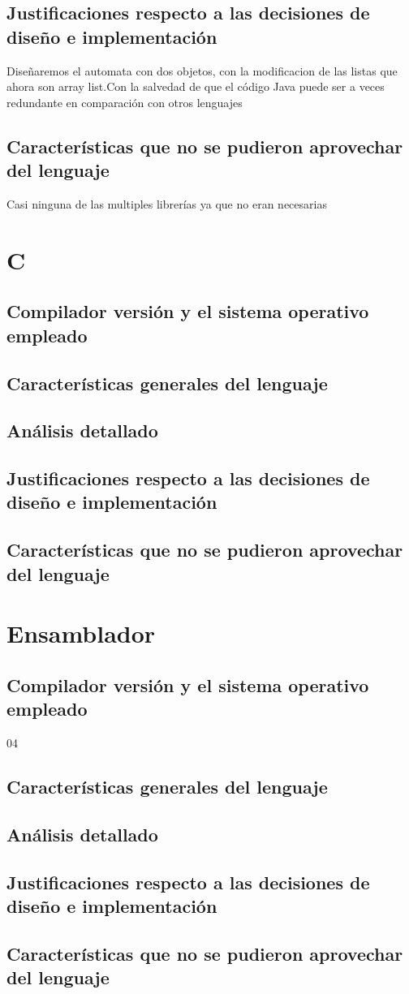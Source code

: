 \documentclass[12pt,a4paper]{article}
\begin{document}
    \subsection{Justificaciones respecto a las decisiones de diseño e implementación}
    Diseñaremos el automata con dos objetos, con la modificacion de las listas que ahora son array list.Con la salvedad de que el código Java puede ser a veces redundante en comparación con otros lenguajes
    \subsection{Características que no se pudieron aprovechar del lenguaje}
    Casi ninguna de las multiples librerías ya que no eran necesarias
      \section{C}
       \subsection{Compilador versión y el sistema operativo empleado}
        \subsection{Características generales del lenguaje}
        \subsection{Análisis detallado}
        \subsection{Justificaciones respecto a las decisiones de diseño e implementación}
        \subsection{Características que no se pudieron aprovechar del lenguaje}
          \section{Ensamblador}
           \subsection{Compilador versión y el sistema operativo empleado}04
            \subsection{Características generales del lenguaje}
            \subsection{Análisis detallado}
            \subsection{Justificaciones respecto a las decisiones de diseño e implementación}
            \subsection{Características que no se pudieron aprovechar del lenguaje}
\end{document}
